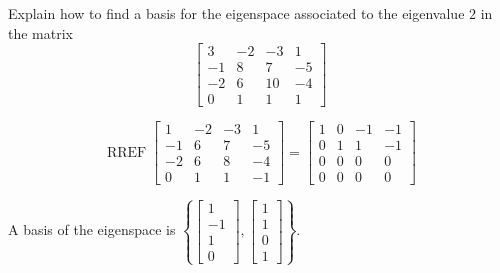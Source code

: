 
\begin{exerciseStatement}


Explain how to find a basis for the eigenspace associated to the eigenvalue \( 2 \) in the matrix \[ \left[\begin{array}{cccc}
3 & -2 & -3 & 1 \\
-1 & 8 & 7 & -5 \\
-2 & 6 & 10 & -4 \\
0 & 1 & 1 & 1
\end{array}\right] \]


\end{exerciseStatement}
    
\begin{exerciseAnswer} 


\[\operatorname{RREF} \left[\begin{array}{cccc}
1 & -2 & -3 & 1 \\
-1 & 6 & 7 & -5 \\
-2 & 6 & 8 & -4 \\
0 & 1 & 1 & -1
\end{array}\right] = \left[\begin{array}{cccc}
1 & 0 & -1 & -1 \\
0 & 1 & 1 & -1 \\
0 & 0 & 0 & 0 \\
0 & 0 & 0 & 0
\end{array}\right] \]



A basis of the eigenspace is \( \left\{ \left[\begin{array}{c}
1 \\
-1 \\
1 \\
0
\end{array}\right] , \left[\begin{array}{c}
1 \\
1 \\
0 \\
1
\end{array}\right] \right\} \).


\end{exerciseAnswer}
    

